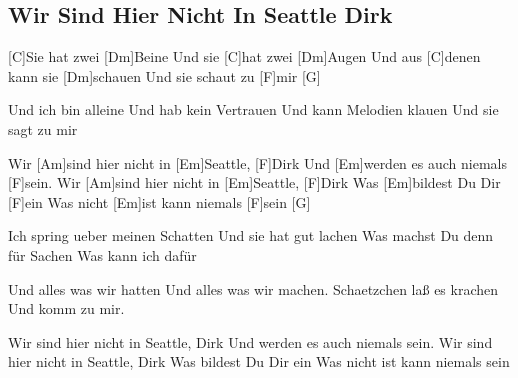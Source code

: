 \subsection*{Wir Sind Hier Nicht In Seattle Dirk   }



\begin{guitar}

[C]Sie hat zwei [Dm]Beine
Und sie [C]hat zwei [Dm]Augen
Und aus [C]denen kann sie [Dm]schauen
Und sie schaut zu [F]mir [G] $\quad$


Und ich bin alleine
Und hab kein Vertrauen
Und kann Melodien klauen
Und sie sagt zu mir


Wir [Am]sind hier nicht in [Em]Seattle, [F]Dirk
Und [Em]werden es auch niemals [F]sein.
Wir [Am]sind hier nicht in [Em]Seattle, [F]Dirk
Was [Em]bildest Du Dir [F]ein
Was nicht [Em]ist kann niemals [F]sein [G] $\quad$


Ich spring ueber meinen Schatten
Und sie hat gut lachen
Was machst Du denn für Sachen
Was kann ich dafür

Und alles was wir hatten
Und alles was wir machen.
Schaetzchen laß es krachen
Und komm zu mir.

Wir sind hier nicht in Seattle, Dirk
Und werden es auch niemals sein.
Wir sind hier nicht in Seattle, Dirk
Was bildest Du Dir ein
Was nicht ist kann niemals sein

\end{guitar}
